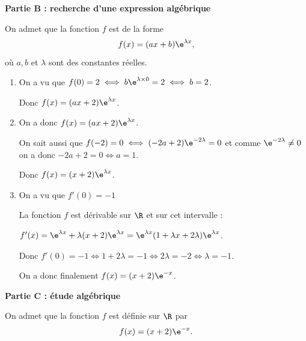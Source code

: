 \medskip

\begin{center}\textbf{Partie B :  recherche d'une expression algébrique}\end{center}

On admet que la fonction $f$ est de la forme 
\[f(x)= (ax + b)\e^{\lambda x},\]
où $a, b$ et $\lambda$ sont des constantes réelles.



\medskip

\begin{enumerate}
\item 
On a vu que $f(0) = 2 \iff b\e^{\lambda \times 0} = 2 \iff b = 2$.

Donc $f(x) = (ax + 2)\e^{\lambda x}$.
\item 

On a donc $f(x) = (ax + 2)\e^{\lambda x}$.

On sait aussi que $f(-2) = 0 \iff (-2a + 2)\e^{-2\lambda } = 0$ et comme $\e^{-2\lambda }  \ne 0$ on a donc $-2a + 2 = 0 \iff a = 1$.

Donc $f(x) = (x + 2)\e^{\lambda x}$.
\item 
On a vu que $f'(0) = - 1$

La fonction $f$ est dérivable sur $\R$ et sur cet intervalle :

$f'(x) = \e^{\lambda x} + \lambda (x + 2)\e^{\lambda x} = \e^{\lambda x}(1 + \lambda x + 2\lambda )\e^{\lambda x}$.

Donc $f'(0) = - 1 \iff 1  + 2\lambda = - 1 \iff 2\lambda  = - 2 \iff \lambda = - 1 $.

On a donc finalement $f(x) = (x + 2)\e^{- x}$.
\end{enumerate}

\medskip

\begin{center}\textbf{Partie C : étude algébrique}\end{center}

On admet que la fonction $f$ est définie sur $\R$ par 
\[f(x) = (x + 2)\e^{-x}.\]

\smallskip

